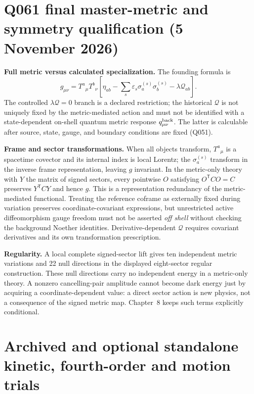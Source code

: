 \documentclass[11pt,a4paper]{article}
\begin{document}
\section{Q061 final master-metric and symmetry qualification (5 November 2026)}
\noindent\textbf{Full metric versus calculated specialization.} The founding formula is
\begin{equation}\label{eq:q061-ch2-master}
\boxed{g_{\mu\nu}=T^a{}_{\mu}T^b{}_{\nu}\left[\eta_{ab}-\sum_s\varepsilon_s\sigma_a^{(s)}\sigma_b^{(s)}-\lambda\mathcal Q_{ab}\right].}
\end{equation}
The controlled $\lambda\mathcal Q=0$ branch is a declared restriction; the historical $\mathcal Q$ is not uniquely fixed by the metric-mediated action and must not be identified with a state-dependent on-shell quantum metric response $q_{\mu\nu}^{\rm back}$. The latter is calculable after source, state, gauge, and boundary conditions are fixed (Q051).

\noindent\textbf{Frame and sector transformations.} When all objects transform, $T^a{}_{\mu}$ is a spacetime covector and its internal index is local Lorentz; the $\sigma_a^{(s)}$ transform in the inverse frame representation, leaving $g$ invariant. In the metric-only theory with $Y$ the matrix of signed sectors, every pointwise $O$ satisfying $O^{\mathsf T}CO=C$ preserves $Y^{\mathsf T}CY$ and hence $g$. This is a representation redundancy of the metric-mediated functional. Treating the reference coframe as externally fixed during variation preserves coordinate-covariant expressions, but unrestricted active diffeomorphism gauge freedom must not be asserted \emph{off shell} without checking the background Noether identities. Derivative-dependent $\mathcal Q$ requires covariant derivatives and its own transformation prescription.

\noindent\textbf{Regularity.} A local complete signed-sector lift gives ten independent metric variations and 22 null directions in the displayed eight-sector regular construction. These null directions carry no independent energy in a metric-only theory. A nonzero cancelling-pair amplitude cannot become dark energy just by acquiring a coordinate-dependent value: a direct sector action is new physics, not a consequence of the signed metric map. Chapter~8 keeps such terms explicitly conditional.


\appendix
\section{Archived and optional standalone kinetic, fourth-order and motion trials}\label{app:historical-operators}
\end{document}
